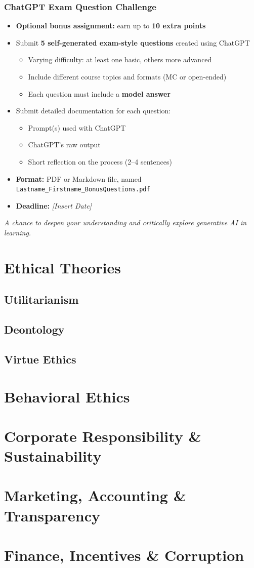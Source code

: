 \documentclass[aspectratio=169, 10pt]{beamer}
\begin{document}
\begin{frame}
\frametitle{ChatGPT Exam Question Challenge}

\begin{itemize}
  \item \textbf{Optional bonus assignment:} earn up to \textbf{10 extra points}
  \item Submit \textbf{5 self-generated exam-style questions} created using ChatGPT
  \begin{itemize}
    \item Varying difficulty: at least one basic, others more advanced
    \item Include different course topics and formats (MC or open-ended)
    \item Each question must include a \textbf{model answer}
  \end{itemize}
  \item Submit detailed documentation for each question:
  \begin{itemize}
    \item Prompt(s) used with ChatGPT
    \item ChatGPT’s raw output
    \item Short reflection on the process (2–4 sentences)
  \end{itemize}
  \item \textbf{Format:} PDF or Markdown file, named \texttt{Lastname\_Firstname\_BonusQuestions.pdf}
  \item \textbf{Deadline:} \textit{[Insert Date]}
\end{itemize}

\vspace{0.8em}
\centering
\textit{A chance to deepen your understanding and critically explore generative AI in learning.}
\end{frame}


\section{Ethical Theories}

\subsection{Utilitarianism}
\subsection{Deontology}
\subsection{Virtue Ethics}

\section{Behavioral Ethics}

\section{Corporate Responsibility \& Sustainability}
\section{Marketing, Accounting \& Transparency}
\section{Finance, Incentives \& Corruption}
\end{document}
